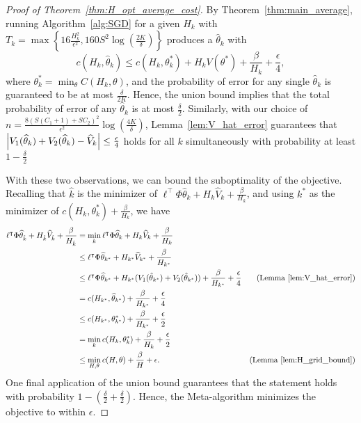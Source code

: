 \documentclass[11pt]{article}
\begin{document}
\begin{proof}[Proof of Theorem~\ref{thm:H_opt_average_cost}]
  By Theorem~\ref{thm:main_average}, running Algorithm~\ref{alg:SGD} for a given $H_k$ with $T_k = \max\left\{ 16\frac{H_k^2}{\epsilon^2}, 160 S^2 \log\left(\frac{2K}{\delta}\right)\right \}$ produces a $\widehat \theta_k$ with
\[
  c(H_k,\widehat\theta_k)\leq c(H_k,\theta_k^*) + H_kV(\theta^*)+ \frac{\beta}{H_k} + \frac{\epsilon}{4},
\]
where $\theta^*_k = \min_\theta C(H_k,\theta)$, and the probability of error for any single $\widehat\theta_k$ is guaranteed to be at most $\frac{\delta}{2K}$. Hence, the union bound implies that the total probability of error of any $\widehat\theta_k$ is at most $\frac{\delta}{2}$. Similarly, with our choice of $n = \frac{8(S(C_1+1)+SC_2)^2} {\epsilon^2}\log\left(\frac{4K}{\delta}\right)$, Lemma~\ref{lem:V_hat_error} guarantees that  $\abs{V_1(\widehat\theta_k)+V_2(\widehat\theta_k) -
  \widehat V_k}\leq\frac{\epsilon}{4}$
holds for all $k$ simultaneously with probability at least $1-\frac{\delta}{2}$

With these two observations, we can bound the suboptimality of the objective. Recalling that $\hat k$ is the minimizer of $\ell^\top\Phi\widehat\theta_{k} + H_{k} \widehat V_k + \frac{\beta}{H_{k}}$, and using $k^*$ as the minimizer of
$c(H_k,\theta_k^*) + \frac{\beta}{H_k}$, we have
    \begin{align*}
      \ell^\top\Phi\widehat\theta_{\hat k} + H_{\hat k} \widehat V_{\hat k}
      + \frac{\beta}{H_{\hat k}}
      &=
        \min_k \ell^\top\Phi\widehat\theta_{k} + H_{k} \widehat V_k
      + \frac{\beta}{H_{k}}\\
      &\leq
        \ell^\top\Phi\widehat\theta_{k^*} + H_{k^*} \widehat V_{k^*}
        + \frac{\beta}{H_{k^*}}\\
      &\leq
        \ell^\top\Phi\widehat\theta_{k^*} + H_{k^*} (V_1(\hat\theta_{k^*}) + V_2(\hat\theta_{k^*}))
         + \frac{\beta}{H_{k^*}} + \frac{\epsilon}{4}
      &\text{(Lemma~\ref{lem:V_hat_error})}\\
      &=
        c(H_{k^*},\widehat \theta_{k^*})
         + \frac{\beta}{H_{k^*}} + \frac{\epsilon}{4}\\
      &\leq
        c(H_{k^*},\theta_{k^*}^*) + \frac{\beta}{H_{k^*}}
        + \frac{\epsilon}{2}\\
      &=\min_k
        c(H_k,\theta_k^*) + \frac{\beta}{H_k}
        + \frac{\epsilon}{2}\\
      &\leq  \min_{H,\theta} c(H,\theta) + \frac{\beta}{H}
        + \epsilon.
      &\text{(Lemma~\ref{lem:H_grid_bound})}
\end{align*}
One final application of the union bound guarantees that the statement holds with probability $1-(\frac{\delta}{2} + \frac{\delta}{2})$. Hence, the Meta-algorithm minimizes the objective to within $\epsilon$.


\end{proof}
\end{document}
